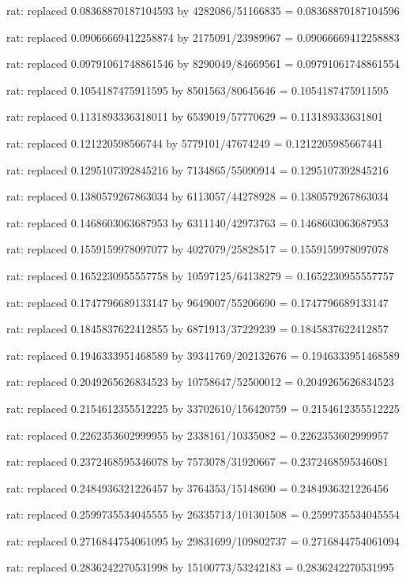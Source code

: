\documentclass[a4paper,10pt]{article}
\begin{document}
\begin{eulernotebook}
\begin{eulercomment}
\begin{eulercomment}
\begin{eulercomment}
\begin{eulercomment}
\begin{eulercomment}
\begin{eulercomment}
\begin{eulercomment}
\begin{eulercomment}
\begin{eulercomment}
\begin{eulercomment}
\begin{eulercomment}
\begin{eulercomment}
\begin{eulercomment}
\begin{eulercomment}
\begin{eulercomment}
\begin{eulercomment}
\begin{euleroutput}
  rat: replaced 0.08368870187104593 by 4282086/51166835 = 0.08368870187104596
  
  rat: replaced 0.09066669412258874 by 2175091/23989967 = 0.09066669412258883
  
  rat: replaced 0.09791061748861546 by 8290049/84669561 = 0.09791061748861554
  
  rat: replaced 0.1054187475911595 by 8501563/80645646 = 0.1054187475911595
  
  rat: replaced 0.1131893336318011 by 6539019/57770629 = 0.113189333631801
  
  rat: replaced 0.121220598566744 by 5779101/47674249 = 0.1212205985667441
  
  rat: replaced 0.1295107392845216 by 7134865/55090914 = 0.1295107392845216
  
  rat: replaced 0.1380579267863034 by 6113057/44278928 = 0.1380579267863034
  
  rat: replaced 0.1468603063687953 by 6311140/42973763 = 0.1468603063687953
  
  rat: replaced 0.1559159978097077 by 4027079/25828517 = 0.1559159978097078
  
  rat: replaced 0.1652230955557758 by 10597125/64138279 = 0.1652230955557757
  
  rat: replaced 0.1747796689133147 by 9649007/55206690 = 0.1747796689133147
  
  rat: replaced 0.1845837622412855 by 6871913/37229239 = 0.1845837622412857
  
  rat: replaced 0.1946333951468589 by 39341769/202132676 = 0.1946333951468589
  
  rat: replaced 0.2049265626834523 by 10758647/52500012 = 0.2049265626834523
  
  rat: replaced 0.2154612355512225 by 33702610/156420759 = 0.2154612355512225
  
  rat: replaced 0.2262353602999955 by 2338161/10335082 = 0.2262353602999957
  
  rat: replaced 0.2372468595346078 by 7573078/31920667 = 0.2372468595346081
  
  rat: replaced 0.2484936321226457 by 3764353/15148690 = 0.2484936321226456
  
  rat: replaced 0.2599735534045555 by 26335713/101301508 = 0.2599735534045554
  
  rat: replaced 0.2716844754061095 by 29831699/109802737 = 0.2716844754061094
  
  rat: replaced 0.2836242270531998 by 15100773/53242183 = 0.2836242270531995
  

\end{euleroutput}
\end{eulercomment}
\end{eulercomment}
\end{eulercomment}
\end{eulercomment}
\end{eulercomment}
\end{eulercomment}
\end{eulercomment}
\end{eulercomment}
\end{eulercomment}
\end{eulercomment}
\end{eulercomment}
\end{eulercomment}
\end{eulercomment}
\end{eulercomment}
\end{eulercomment}
\end{eulercomment}
\end{eulernotebook}
\end{document}
